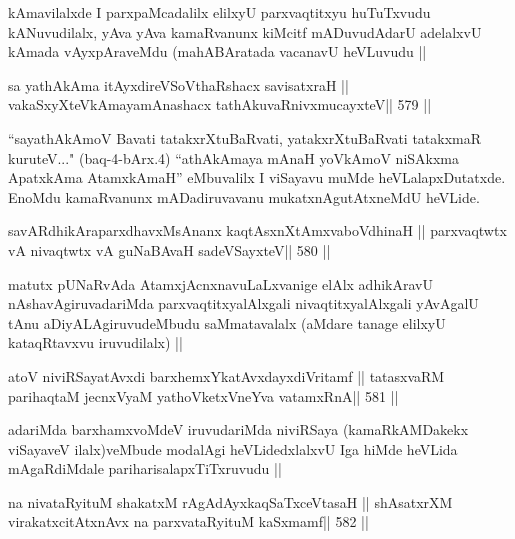 \begin{artha}
kAmavilalxde I parxpaMcadalilx elilxyU parxvaqtitxyu huTuTxvudu
kANuvudilalx, yAva yAva kamaRvanunx kiMcitf mADuvudAdarU adelalxvU
kAmada vAyxpAraveMdu (mahABAratada vacanavU heVLuvudu || 
\end{artha}



\begin{shl}
sa yathAkAma itAyxdireVSoV\s thaRshacx savisatxraH ||
vakaSxyXteV\s kAmayamAnashacx tathA\s kuvaRnivxmucayxteV\hfill || 579 ||
\end{shl}

\begin{artha}
``sayathAkAmoV Bavati tatakxrXtuBaRvati, yatakxrXtuBaRvati tatakxmaR
  kuruteV..." (baq-4-bArx.4) ``athA\s kAmaya mAnaH yoV\s kAmoV
  niSAkxma ApatxkAma AtamxkAmaH'' eMbuvalilx I viSayavu muMde
  heVLalapxDutatxde. EnoMdu kamaRvanunx mADadiruvavanu
  mukatxnAgutAtxneMdU heVLide.
\end{artha}

\begin{shl}
savARdhikAraparxdhavxMsAnanx kaqtAsxnXtAmxvaboVdhinaH ||
parxvaqtwtx vA nivaqtwtx vA guNaBAvaH sadeVSayxteV\hfill || 580 ||
\end{shl}

\begin{artha}
matutx pUNaRvAda AtamxjAcnxnavuLaLxvanige elAlx adhikAravU
nAshavAgiruvadariMda parxvaqtitxyalAlxgali nivaqtitxyalAlxgali
yAvAgalU tAnu aDiyALAgiruvudeMbudu saMmatavalalx (aMdare tanage
elilxyU kataqRtavxvu iruvudilalx) ||
\end{artha}

\begin{shl}
atoV niviRSayatAvxdi barxhemxYkatAvxdayxdiVritamf ||
tatasxvaRM parihaqtaM jecnxVyaM yathoVketxVneYva vatamxRnA\hfill || 581 ||
\end{shl}

\begin{artha}
adariMda barxhamxvoMdeV iruvudariMda niviRSaya (kamaRkAMDakekx
viSayaveV ilalx)veMbude modalAgi heVLidedxlalxvU Iga hiMde heVLida
mAgaRdiMdale pariharisalapxTiTxruvudu ||
\end{artha}



\begin{shl}
na nivataRyituM shakatxM rAgAdAyxkaqSaTxceVtasaH ||
shAsatxrXM virakatxcitAtxnAvx na parxvataRyituM kaSxmamf\hfill || 582 ||
\end{shl}

